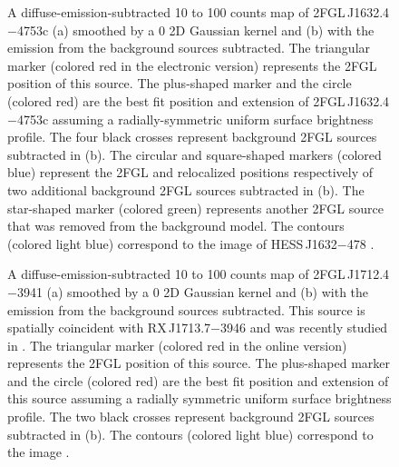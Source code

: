 \documentclass[12pt,preprint]{aastex}
\newif\ifcolorfigure
\newcommand{\gev}{\text{GeV}\xspace}
\newcommand{\tev}{\text{TeV}\xspace}
\begin{document}
\begin{figure}
    \ifcolorfigure
      \plotone{source_plots/source_HESS_J1632-478_color.eps}
    \else
    \fi
  \caption{
  A diffuse-emission-subtracted 10 \gev to 100 \gev counts map of
  2FGL\,J1632.4$-$4753c (a) smoothed by a 0 2D Gaussian
  kernel and (b) with the emission from the background sources subtracted.  
  The triangular marker (colored red in the electronic version)
  represents the 2FGL position of this source.  The plus-shaped marker
  and the circle (colored red) are the best fit position and extension of
  2FGL\,J1632.4$-$4753c assuming a radially-symmetric uniform surface
  brightness profile.  
  The four black crosses represent background 2FGL
  sources subtracted in (b).  The 
  circular and square-shaped markers (colored blue) represent 
  the 2FGL and relocalized positions respectively of two
  additional background 2FGL sources subtracted in (b).
  The star-shaped marker (colored green) represents another 2FGL
  source that was removed from the background model.  
  The contours (colored light blue) correspond to the \tev image of
  HESS\,J1632$-$478 \citep{hess_plane_survey}.
  }\label{1FGL_J1632.9-4802c}
\end{figure}

\begin{figure}
    \ifcolorfigure
      \plotone{source_plots/source_RX_J1713.7-3946_color.eps}
    \else
    \fi
  \caption{
  A diffuse-emission-subtracted 10 \gev to 100 \gev counts map
  of 2FGL\,J1712.4$-$3941 (a) smoothed by a 0 2D
  Gaussian kernel and (b) with the emission from the background sources
  subtracted.  This source is spatially coincident with RX\,J1713.7$-$3946
  and was recently studied in \cite{rx_j1713_lat}.  The triangular marker
  (colored red in the online version) represents the 2FGL position of
  this source.  The plus-shaped marker and the circle (colored red) are
  the best fit position and extension of this source assuming a radially
  symmetric uniform surface brightness profile.  
  The two black crosses represent background 2FGL sources subtracted in (b).
  The contours (colored light blue)
  correspond to the \tev image \citep{rx_j1713_hess}.  
  }\label{2FGL_J1712.4-3941}
\end{figure}
\end{document}
